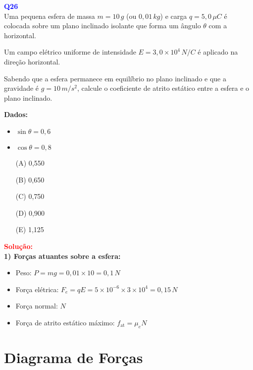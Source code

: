 \documentclass[a4paper,12pt]{article}
\begin{document}
\begin{flushleft}
\textbf{\textcolor{blue}{\Large Q26}}\\

Uma pequena esfera de massa $m = 10\,g$ (ou $0{,}01\,kg$) e carga $q = 5,0\,\mu C$ é colocada sobre um plano inclinado isolante 
que forma um ângulo $\theta$ com a horizontal. 

Um campo elétrico uniforme de intensidade $E = 3,0 \times 10^4\,N/C$ é aplicado na direção horizontal.

Sabendo que a esfera permanece em equilíbrio no plano inclinado e que a gravidade é $g = 10\,m/s^2$, calcule o coeficiente de atrito 
estático entre a esfera e o plano inclinado.

\textbf{Dados:}

\begin{itemize}
\item $\sin\theta = 0{,}6$
\item $\cos\theta = 0{,}8$
\end{itemize}

\begin{itemize}
\item[(A)] 0{,}550
\item[(B)] 0{,}650  
\item[(C)] 0{,}750
\item[(D)] 0{,}900
\item[(E)] 1,125
\end{itemize}

\vspace{0.5cm}

\textcolor{red}{\textbf{Solução:}}\\

\textbf{1) Forças atuantes sobre a esfera:}

\begin{itemize}
\item Peso: $P = mg = 0{,}01 \times 10 = 0{,}1\,N$
\item Força elétrica: $F_e = qE = 5 \times 10^{-6} \times 3 \times 10^4 = 0{,}15\,N$
\item Força normal: $N$
\item Força de atrito estático máximo: $f_{\text{at}} = \mu_e N$
\end{itemize}

\section*{Diagrama de Forças}


\end{flushleft}
\end{document}
